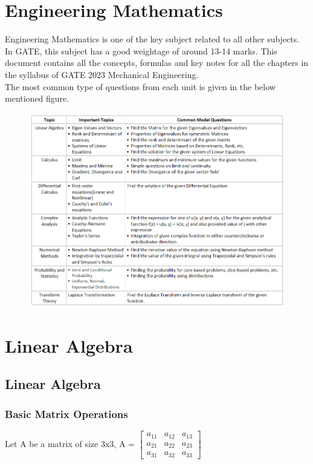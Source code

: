 \chapter[Engineering Mathematics]{Engineering Mathematics}
Engineering Mathematics is one of the key subject related to all other subjects. In GATE, this subject has a good weightage of around 13-14 marks. This document contains all the concepts, formulas and key notes for all the chapters in the syllabus of GATE 2023 Mechanical Engineering.\\
The most common type of questions from each unit is given in the below mentioned figure.
\begin{figure}[h!]
    \centering
    \includegraphics[width=\linewidth]{images/engineering-mathematics.png}
\end{figure}


\chapter*{Linear Algebra}
\section{Linear Algebra}

\subsection{Basic Matrix Operations}
Let A be a matrix of size 3x3, A = 
$\begin{bmatrix}
a_{11} & a_{12} & a_{13}\\
a_{21} & a_{22} & a_{23}\\
a_{31} & a_{32} & a_{33}
\end{bmatrix}$

